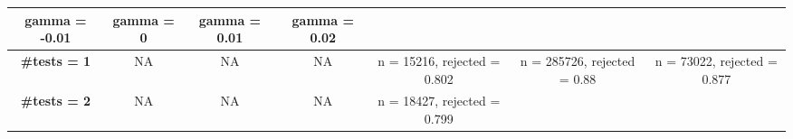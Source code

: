 \documentclass[
]{article}
\begin{document}
\begin{longtable}[]{@{}ccccccc@{}}
\begin{minipage}[b]{0.08\columnwidth}
gamma = -0.01\strut
\end{minipage} & \begin{minipage}[b]{0.15\columnwidth}\centering
gamma = 0\strut
\end{minipage} & \begin{minipage}[b]{0.16\columnwidth}\centering
gamma = 0.01\strut
\end{minipage} & \begin{minipage}[b]{0.16\columnwidth}\centering
gamma = 0.02\strut
\end{minipage}\tabularnewline
\midrule
\endhead
\begin{minipage}[t]{0.09\columnwidth}\centering
\textbf{\#tests = 1}\strut
\end{minipage} & \begin{minipage}[t]{0.08\columnwidth}\centering
NA\strut
\end{minipage} & \begin{minipage}[t]{0.08\columnwidth}\centering
NA\strut
\end{minipage} & \begin{minipage}[t]{0.08\columnwidth}\centering
NA\strut
\end{minipage} & \begin{minipage}[t]{0.15\columnwidth}\centering
n = 15216, rejected = 0.802\strut
\end{minipage} & \begin{minipage}[t]{0.16\columnwidth}\centering
n = 285726, rejected = 0.88\strut
\end{minipage} & \begin{minipage}[t]{0.16\columnwidth}\centering
n = 73022, rejected = 0.877\strut
\end{minipage}\tabularnewline
\begin{minipage}[t]{0.09\columnwidth}\centering
\textbf{\#tests = 2}\strut
\end{minipage} & \begin{minipage}[t]{0.08\columnwidth}\centering
NA\strut
\end{minipage} & \begin{minipage}[t]{0.08\columnwidth}\centering
NA\strut
\end{minipage} & \begin{minipage}[t]{0.08\columnwidth}\centering
NA\strut
\end{minipage} & \begin{minipage}[t]{0.15\columnwidth}\centering
n = 18427, rejected = 0.799\strut
\end{minipage} & \begin{minipage}[t]{0.16\columnwidth}\centering

\end{minipage}
\end{longtable}
\end{document}
